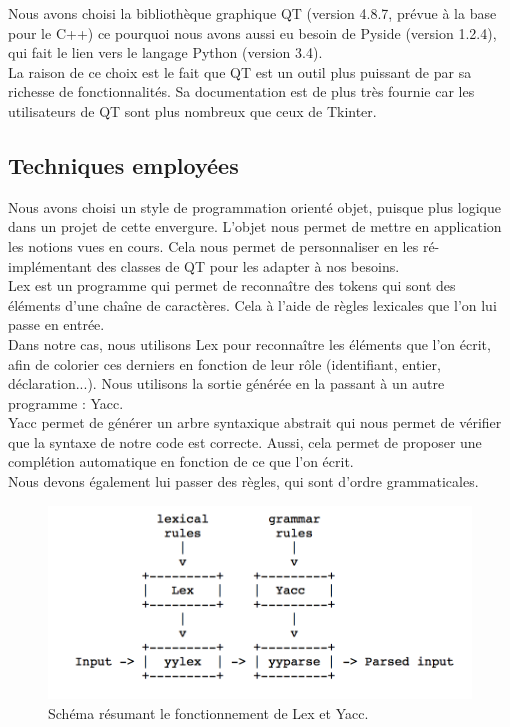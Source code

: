 \documentclass[a4paper,12pt]{article}
\begin{document}
	Nous avons choisi la bibliothèque graphique QT (version 4.8.7, prévue à la base pour le C++) ce pourquoi nous avons aussi eu besoin de Pyside (version 1.2.4), qui fait le lien vers le langage Python (version 3.4).\\
	
	La raison de ce choix est le fait que QT est un outil plus puissant de par sa richesse de fonctionnalités. Sa documentation est de plus très fournie car les utilisateurs de QT sont plus nombreux que ceux de Tkinter.
	
	\subsection{Techniques employées}
	
	Nous avons choisi un style de programmation orienté objet, puisque plus logique dans un projet de cette envergure. L'objet nous permet de mettre en application les notions vues en cours. Cela nous permet de personnaliser en les ré-implémentant des classes de QT pour les adapter à nos besoins.\\
	
	Lex est un programme qui permet de reconnaître des tokens qui sont des éléments d'une chaîne de caractères. Cela à l'aide de règles lexicales que l'on lui passe en entrée.\\
	Dans notre cas, nous utilisons Lex pour reconnaître les éléments que l'on écrit, afin de colorier ces derniers en fonction de leur rôle (identifiant, entier, déclaration...). Nous utilisons la sortie générée en la passant à un autre programme : Yacc.\\
	
	Yacc permet de générer un arbre syntaxique abstrait qui nous permet de vérifier que la syntaxe de notre code est correcte. Aussi, cela permet de proposer une complétion automatique en fonction de ce que l'on écrit.\\
	Nous devons également lui passer des règles, qui sont d'ordre grammaticales.
	
	\begin{figure}[h!]
		\begin{center}
			\includegraphics[scale=0.7]{images/schema_lex_yacc}
			\caption{Schéma résumant le fonctionnement de Lex et Yacc.}
		\end{center}
	\end{figure}
	
\end{document}
